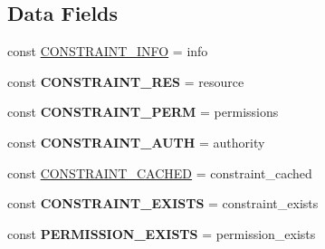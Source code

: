 \subsection*{Data Fields}
\begin{DoxyCompactItemize}
\item 
const \hyperlink{interface_able_polecat___resource___restricted_interface_a3a1aa131b9d97400218b513393474376}{C\+O\+N\+S\+T\+R\+A\+I\+N\+T\+\_\+\+I\+N\+F\+O} = \textquotesingle{}info\textquotesingle{}
\item 
\hypertarget{interface_able_polecat___resource___restricted_interface_a726b204d14768f5192dd8bee94b78781}{}const {\bfseries C\+O\+N\+S\+T\+R\+A\+I\+N\+T\+\_\+\+R\+E\+S} = \textquotesingle{}resource\textquotesingle{}\label{interface_able_polecat___resource___restricted_interface_a726b204d14768f5192dd8bee94b78781}

\item 
\hypertarget{interface_able_polecat___resource___restricted_interface_ab84ac72e43659f8fcb0830a8c534f8f9}{}const {\bfseries C\+O\+N\+S\+T\+R\+A\+I\+N\+T\+\_\+\+P\+E\+R\+M} = \textquotesingle{}permissions\textquotesingle{}\label{interface_able_polecat___resource___restricted_interface_ab84ac72e43659f8fcb0830a8c534f8f9}

\item 
\hypertarget{interface_able_polecat___resource___restricted_interface_ab3bcb5f662e2bca9da015a2c48cd8ff7}{}const {\bfseries C\+O\+N\+S\+T\+R\+A\+I\+N\+T\+\_\+\+A\+U\+T\+H} = \textquotesingle{}authority\textquotesingle{}\label{interface_able_polecat___resource___restricted_interface_ab3bcb5f662e2bca9da015a2c48cd8ff7}

\item 
const \hyperlink{interface_able_polecat___resource___restricted_interface_ab27573795ab9be601eaa1e5264d56f79}{C\+O\+N\+S\+T\+R\+A\+I\+N\+T\+\_\+\+C\+A\+C\+H\+E\+D} = \textquotesingle{}constraint\+\_\+cached\textquotesingle{}
\item 
\hypertarget{interface_able_polecat___resource___restricted_interface_ac14921dde0a18a99f3a4da0b1d7a52a6}{}const {\bfseries C\+O\+N\+S\+T\+R\+A\+I\+N\+T\+\_\+\+E\+X\+I\+S\+T\+S} = \textquotesingle{}constraint\+\_\+exists\textquotesingle{}\label{interface_able_polecat___resource___restricted_interface_ac14921dde0a18a99f3a4da0b1d7a52a6}

\item 
\hypertarget{interface_able_polecat___resource___restricted_interface_acdc8156236c2b7c358b0a6649cfad3a2}{}const {\bfseries P\+E\+R\+M\+I\+S\+S\+I\+O\+N\+\_\+\+E\+X\+I\+S\+T\+S} = \textquotesingle{}permission\+\_\+exists\textquotesingle{}\label{interface_able_polecat___resource___restricted_interface_acdc8156236c2b7c358b0a6649cfad3a2}

\end{DoxyCompactItemize}

